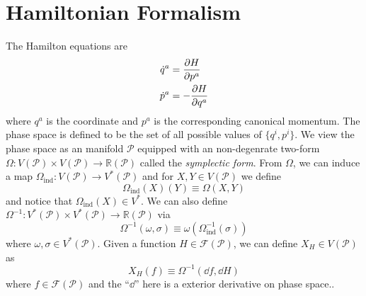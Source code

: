\documentclass[10pt]{article}
\begin{document}
\section{Hamiltonian Formalism}
The Hamilton equations are
\begin{subequations}
    \begin{align}
        \dot{q}^a & =\pdv{H}{p^a}  \\
        \dot{p}^a & =-\pdv{H}{q^a}
    \end{align}
\end{subequations}
where $q^a$ is the coordinate and $p^a$ is the corresponding canonical momentum.
The phase space is defined to be the set of all possible values of $\{q^i,p^i\}$.
We view the phase space as an manifold $\mathcal{P}$ equipped with an non-degenrate two-form $\Omega:V(\mathcal{P})\times V(\mathcal{P})\to\mathbb{R}(\mathcal{P})$ called the \textit{symplectic form}.
From $\Omega$, we can induce a map $\Omega_{\text{ind}}:V(\mathcal{P})\to V^\ast(\mathcal{P})$ and for $X,Y\in V(\mathcal{P})$ we define
\begin{equation}
    \Omega_{\text{ind}}(X)(Y)\equiv\Omega(X,Y)
\end{equation}
and notice that $\Omega_{\text{ind}}(X)\in V^\ast$.
We can also define $\Omega^{-1}:V^\ast(\mathcal{P})\times V^\ast(\mathcal{P})\to \mathbb{R}(\mathcal{P})$ via
\begin{equation}\label{eq:omega-1}
    \Omega^{-1}(\omega,\sigma)\equiv\omega(\Omega_{\text{ind}}^{-1}(\sigma))
\end{equation}
where $\omega,\sigma\in V^\ast(\mathcal{P})$.
Given a function $H\in\mathcal{F}(\mathcal{P})$, we can define $X_H\in V(\mathcal{P})$ as
\begin{equation}
    X_H(f)\equiv\Omega^{-1}(\dd{f},\dd{H})
\end{equation}
where $f\in\mathcal{F}(\mathcal{P})$ and the ``$\dd$'' here is a exterior derivative on phase space..
\end{document}
